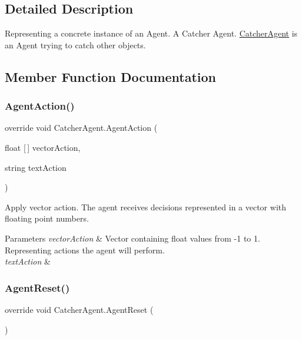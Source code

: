 \subsection{Detailed Description}
Representing a concrete instance of an Agent. A Catcher Agent. \mbox{\hyperlink{class_catcher_agent}{Catcher\+Agent}} is an Agent trying to catch other objects. 



\subsection{Member Function Documentation}
\mbox{\label{class_catcher_agent_a255f4b05c7f722b4d92cfeb6563d963d}} 
\subsubsection{\texorpdfstring{AgentAction()}{AgentAction()}}
{\footnotesize\ttfamily override void Catcher\+Agent.\+Agent\+Action (\begin{DoxyParamCaption}\item[{float \mbox{[}$\,$\mbox{]}}]{vector\+Action,  }\item[{string}]{text\+Action }\end{DoxyParamCaption})}



Apply vector action. The agent receives decisions represented in a vector with floating point numbers. 


\begin{DoxyParams}{Parameters}
{\em vector\+Action} & Vector containing float values from -\/1 to 1. Representing actions the agent will perform.\\
\hline
{\em text\+Action} & \\
\hline
\end{DoxyParams}
\mbox{\label{class_catcher_agent_aece1c1e97740166d52f5ed4defbe9ace}} 
\subsubsection{\texorpdfstring{AgentReset()}{AgentReset()}}
{\footnotesize\ttfamily override void Catcher\+Agent.\+Agent\+Reset (\begin{DoxyParamCaption}{ }\end{DoxyParamCaption})}



